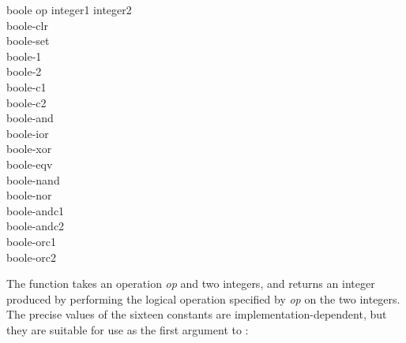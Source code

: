 \begin{defun}[Function][Constant]
boole op integer1 integer2 \\
boole-clr \\
boole-set \\
boole-1 \\
boole-2 \\
boole-c1 \\
boole-c2 \\
boole-and \\
boole-ior \\
boole-xor \\
boole-eqv \\
boole-nand \\
boole-nor \\
boole-andc1 \\
boole-andc2 \\
boole-orc1 \\
boole-orc2

The function  takes an operation \emph{op} and two integers,
and returns an integer produced by performing the logical operation
specified by \emph{op} on the two integers.  The precise values of
the sixteen constants are implementation-dependent, but they are
suitable for use as the first argument to :



\end{defun}
